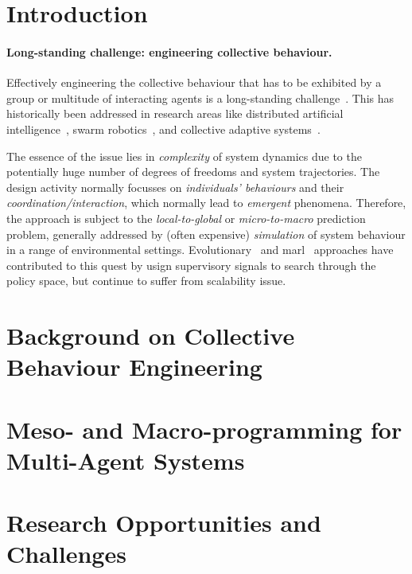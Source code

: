 \documentclass[sigconf,anonymous]{aamas}
\begin{document}
\section{Introduction}
\label{sec:intro}

\paragraph{Long-standing challenge: engineering collective behaviour.} Effectively engineering the collective behaviour 
  that has to be exhibited 
  by a group or multitude of 
  interacting agents
  is a long-standing challenge~\cite{readings-dai-1988,DBLP:journals/swarm/BrambillaFBD13,DBLP:journals/sttt/NicolaJW20,DBLP:journals/tosem/CasadeiAADPSTV25}.
%
This has historically been addressed  
  in research areas 
  like
  distributed artificial intelligence~\cite{readings-dai-1988}, 
  swarm robotics~\cite{DBLP:journals/swarm/BrambillaFBD13},
  and collective adaptive systems~\cite{DBLP:journals/sttt/NicolaJW20}.

The essence of the issue lies in \emph{complexity} of system dynamics 
  due to the potentially huge number of degrees of freedoms
  and system trajectories.
%
The design activity normally focusses on \emph{individuals' behaviours}
  and their \emph{coordination/interaction},
  which normally lead to \emph{emergent} phenomena.
%
Therefore, the approach is subject to the \emph{local-to-global} or \emph{micro-to-macro} prediction problem,
  generally addressed by (often expensive) \emph{simulation}
  of system behaviour in a range of environmental settings.
%
Evolutionary~\cite{} and \ac{marl}~\cite{Hou2025dml-swarm} approaches 
  have contributed to this quest
  by usign supervisory signals to search through the policy space, but continue to suffer from scalability issue.


\cite{DBLP:journals/csur/Casadei23}

\section{Background on Collective Behaviour Engineering}

\section{Meso- and Macro-programming for Multi-Agent Systems}

\section{Research Opportunities and Challenges}
\end{document}
